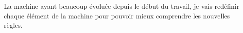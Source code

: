 \documentclass[10pt,a4paper]{article}
\begin{document}
			
			
			
			
			
			
			
			
			
			
			
			
			
			
			
			
			
			
			
			
			
			
			
			
			
			
			
			
			
			
			
			
			
			
			
			
			
			
			
			
			
			
			
			
			
			
			
			 
			\newpage
			La machine ayant beaucoup évoluée depuis le début du travail, je vais redéfinir chaque élément de la machine pour pouvoir mieux comprendre les nouvelles règles.
		\bigbreak
		
\end{document}
